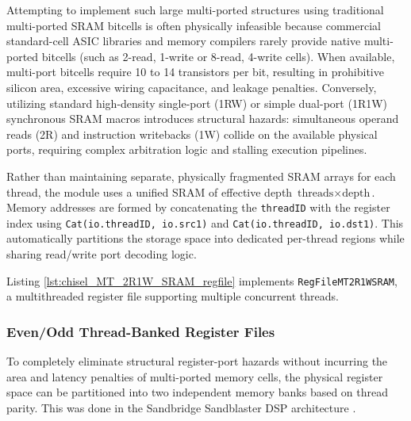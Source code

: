 Attempting to implement such large multi-ported structures using traditional multi-ported SRAM bitcells is often physically infeasible because commercial standard-cell ASIC libraries and memory compilers rarely provide native multi-ported bitcells (such as 2-read, 1-write or 8-read, 4-write cells). When available, multi-port bitcells require 10 to 14 transistors per bit, resulting in prohibitive silicon area, excessive wiring capacitance, and leakage penalties. Conversely, utilizing standard high-density single-port (1RW) or simple dual-port (1R1W) synchronous SRAM macros introduces structural hazards: simultaneous operand reads (2R) and instruction writebacks (1W) collide on the available physical ports, requiring complex arbitration logic and stalling execution pipelines.

Rather than maintaining separate, physically fragmented SRAM arrays for each thread, the module uses a unified SRAM of effective depth $\text{threads} \times \text{depth}$. Memory addresses are formed by concatenating the \texttt{threadID} with the register index using \texttt{Cat(io.threadID, io.src1)} and \texttt{Cat(io.threadID, io.dst1)}. This automatically partitions the storage space into dedicated per-thread regions while sharing read/write port decoding logic.

Listing \ref{lst:chisel_MT_2R1W_SRAM_regfile} implements \texttt{RegFileMT2R1WSRAM}, a multithreaded register file supporting multiple concurrent threads.


\subsubsection{Even/Odd Thread-Banked Register Files} \label{subsec:regfile_even_odd_banked}

To completely eliminate structural register-port hazards without incurring the area and latency penalties of multi-ported memory cells, the physical register space can be partitioned into two independent memory banks based on thread parity. This was done in the Sandbridge Sandblaster DSP architecture \cite{glossner2003sandblaster}. 

